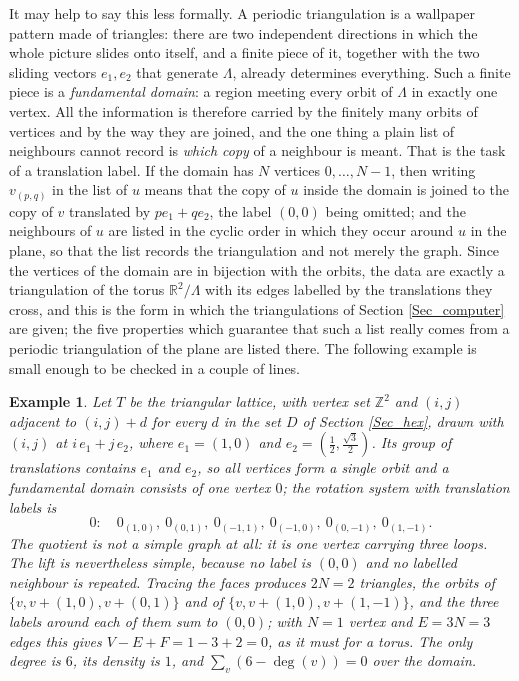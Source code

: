 \documentclass[12pt,a4paper]{article}%
\newtheorem{example}[theorem]{Example}
\begin{document}
It may help to say this less formally. A periodic triangulation is a wallpaper pattern made of
triangles: there are two independent directions in which the whole picture slides onto itself, and a
finite piece of it, together with the two sliding vectors $e_{1},e_{2}$ that generate $\Lambda $,
already determines everything. Such a finite piece is a \emph{fundamental domain}: a region meeting
every orbit of $\Lambda $ in exactly one vertex. All the information is therefore carried by the
finitely many orbits of vertices and by the way they are joined, and the one thing a plain list of
neighbours cannot record is \emph{which copy} of a neighbour is meant. That is the task of a
translation label. If the domain has $N$ vertices $0,\ldots ,N-1$, then writing $v_{(p,q)}$ in the
list of $u$ means that the copy of $u$ inside the domain is joined to the copy of $v$ translated by
$pe_{1}+qe_{2}$, the label $(0,0)$ being omitted; and the neighbours of $u$ are listed in the cyclic
order in which they occur around $u$ in the plane, so that the list records the triangulation and not
merely the graph. Since the vertices of the domain are in bijection with the orbits, the data are
exactly a triangulation of the torus $\mathbb{R}^{2}/\Lambda $ with its edges labelled by the
translations they cross, and this is the form in which the triangulations of Section
\ref{Sec_computer} are given; the five properties which guarantee that such a list really comes from
a periodic triangulation of the plane are listed there. The following example is small enough to be
checked in a couple of lines.

\begin{example}
\label{Ex_trilattice}Let $T$ be the triangular lattice, with vertex set $\mathbb{Z}^{2}$ and $(i,j)$
adjacent to $(i,j)+d$ for every $d$ in the set $D$ of Section \ref{Sec_hex}, drawn with $(i,j)$ at
$i\,e_{1}+j\,e_{2}$, where $e_{1}=(1,0)$ and $e_{2}=(\tfrac{1}{2},\tfrac{\sqrt{3}}{2})$. Its group of
translations contains $e_{1}$ and $e_{2}$, so all vertices form a single orbit and a fundamental
domain consists of one vertex $0$; the rotation system with translation labels is
\[
0:\quad 0_{(1,0)},\ 0_{(0,1)},\ 0_{(-1,1)},\ 0_{(-1,0)},\ 0_{(0,-1)},\ 0_{(1,-1)}.
\]
The quotient is not a simple graph at all: it is one vertex carrying three loops. The lift is
nevertheless simple, because no label is $(0,0)$ and no labelled neighbour is repeated. Tracing the
faces produces $2N=2$ triangles, the orbits of $\{v,v+(1,0),v+(0,1)\}$ and of
$\{v,v+(1,0),v+(1,-1)\}$, and the three labels around each of them sum to $(0,0)$; with $N=1$ vertex
and $E=3N=3$ edges this gives $V-E+F=1-3+2=0$, as it must for a torus. The only degree is $6$, its
density is $1$, and $\sum_{v}(6-\deg (v))=0$ over the domain.
\end{example}
\end{document}
